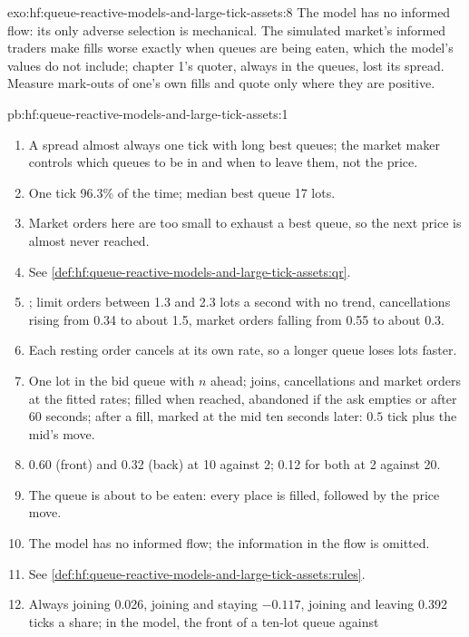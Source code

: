 \begin{solution}{exo:hf:queue-reactive-models-and-large-tick-assets:8}
The model has no informed flow: its only adverse selection is mechanical. The simulated market's informed traders make fills worse exactly when
queues are being eaten, which the model's values do not include; chapter 1's quoter, always in the queues, lost its spread. Measure mark-outs of
one's own fills and quote only where they are positive.
\end{solution}

\begin{solution}{pb:hf:queue-reactive-models-and-large-tick-assets:1}
\begin{enumerate}
\item A spread almost always one tick with long best queues; the market maker controls which queues to be in and when to leave them, not the price.
\item One tick 96.3\% of the time; median best queue 17 lots.
\item Market orders here are too small to exhaust a best queue, so the next price is almost never reached.
\item See \cref{def:hf:queue-reactive-models-and-large-tick-assets:qr}.
\item {}; limit orders between 1.3 and 2.3 lots a second with no trend, cancellations rising
from 0.34 to about 1.5, market orders falling from 0.55 to about 0.3.
\item Each resting order cancels at its own rate, so a longer queue loses lots faster.
\item One lot in the bid queue with $n$ ahead; joins, cancellations and market orders at the fitted rates; filled when reached, abandoned if the ask
empties or after 60 seconds; after a fill, marked at the mid ten seconds later: $0.5$ tick plus the mid's move.
\item 0.60 (front) and 0.32 (back) at 10 against 2; 0.12 for both at 2 against 20.
\item The queue is about to be eaten: every place is filled, followed by the price move.
\item The model has no informed flow; the information in the flow is omitted.
\item See \cref{def:hf:queue-reactive-models-and-large-tick-assets:rules}.
\item Always joining 0.026, joining and staying $-0.117$, joining and leaving 0.392 ticks a share; in the model, the front of a ten-lot queue against

\end{enumerate}
\end{solution}
